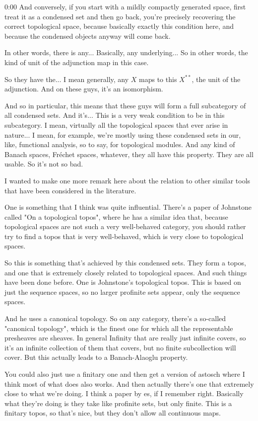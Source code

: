 \begin{unfinished}{0:00}
And conversely, if you start with a mildly compactly generated space, first treat it as a condensed set and then go back, you're precisely recovering the correct topological space, because basically exactly this condition here, and because the condensed objects anyway will come back.

In other words, there is any... Basically, any underlying... So in other words, the kind of unit of the adjunction map in this case.

So they have the... I mean generally, any $X$ maps to this $X^{**}$, the unit of the adjunction. And on these guys, it's an isomorphism.

And so in particular, this means that these guys will form a full subcategory of all condensed sets. And it's... This is a very weak condition to be in this subcategory. I mean, virtually all the topological spaces that ever arise in nature... I mean, for example, we're mostly using these condensed sets in our, like, functional analysis, so to say, for topological modules. And any kind of Banach spaces, Fr\'echet spaces, whatever, they all have this property. They are all usable. So it's not so bad.

I wanted to make one more remark here about the relation to other similar tools that have been considered in the literature.

One is something that I think was quite influential. There's a paper of Johnstone called "On a topological topos", where he has a similar idea that, because topological spaces are not such a very well-behaved category, you should rather try to find a topos that is very well-behaved, which is very close to topological spaces.

So this is something that's achieved by this condensed sets. They form a topos, and one that is extremely closely related to topological spaces. And such things have been done before. One is Johnstone's topological topos. This is based on just the sequence spaces, so no larger profinite sets appear, only the sequence spaces.

And he uses a canonical topology. So on any category, there's a so-called "canonical topology", which is the finest one for which all the representable presheaves are sheaves. In general
Infinity that are really just infinite covers, so it's an infinite collection of them that covers, but no finite subcollection will cover. But this actually leads to a Banach-Alaoglu property.

You could also just use a finitary one and then get a version of astosch where I think most of what does also works. And then actually there's one that extremely close to what we're doing. I think a paper by es, if I remember right. Basically what they're doing is they take like profinite sets, but only finite. This is a finitary topos, so that's nice, but they don't allow all continuous maps.


\end{unfinished}
